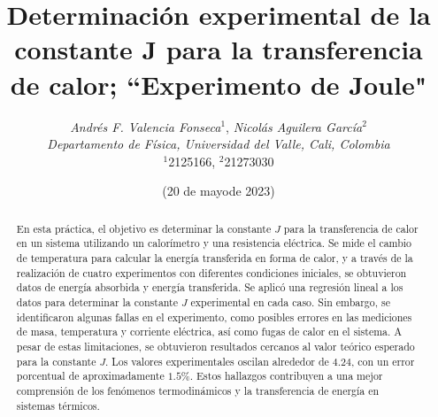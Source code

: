 \documentclass[10pt]{article}
\title{\textbf{Determinación experimental de la constante J para la transferencia de calor; ``Experimento de Joule"}}
\author{\normalsize{\emph{Andrés F. Valencia Fonseca}$^{1}$, \emph{Nicolás Aguilera García}$^{2}$}\\
\normalsize{\emph{Departamento de Física, Universidad del Valle, Cali, Colombia}}\\
\small{$^{1}$2125166, $^{2}$21273030}}
\date{(\small 20 de mayode 2023)}
\begin{document}
\maketitle
\begin{abstract}
En esta práctica, el objetivo es determinar la constante $J$ para la transferencia de calor en un sistema utilizando un calorímetro y una resistencia eléctrica. Se mide el cambio de temperatura para calcular la energía transferida en forma de calor, y a través de la realización de cuatro experimentos con diferentes condiciones iniciales, se obtuvieron datos de energía absorbida y energía transferida. Se aplicó una regresión lineal a los datos para determinar la constante $J$ experimental en cada caso. Sin embargo, se identificaron algunas fallas en el experimento, como posibles errores en las mediciones de masa, temperatura y corriente eléctrica, así como fugas de calor en el sistema. A pesar de estas limitaciones, se obtuvieron resultados cercanos al valor teórico esperado para la constante $J$. Los valores experimentales oscilan alrededor de $4.24$, con 
 un error porcentual de aproximadamente $1.5\%$. 
 Estos hallazgos contribuyen a una mejor comprensión de los fenómenos termodinámicos y la transferencia de energía en sistemas térmicos.
\end{abstract}
\end{document}
